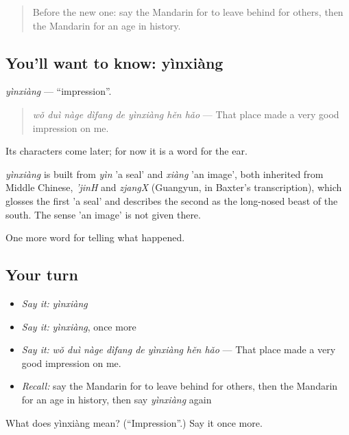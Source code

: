 \label{lesson:ZH-C324-yinxiang}



\begin{quote}
Before the new one: say the Mandarin for to leave behind for others, then the Mandarin for an age in history.
\end{quote}

\subsection*{You'll want to know: yìnxiàng}
\emph{yìnxiàng} — \textquotedblleft{}impression\textquotedblright{}.

\begin{quote}
\emph{wǒ duì nàge dìfang de yìnxiàng hěn hǎo} — That place made a very good impression on me.
\end{quote}

Its characters come later; for now it is a word for the ear.

\begin{cousinweb}
\emph{yìnxiàng} is built from \emph{yìn} 'a seal' and \emph{xiàng} 'an image', both inherited from Middle Chinese, \emph{'jinH} and \emph{zjangX} (Guangyun, in Baxter's transcription), which glosses the first 'a seal' and describes the second as the long-nosed beast of the south. The sense 'an image' is not given there.
\end{cousinweb}

\begin{grammarlens}[title={What you've built}]
One more word for telling what happened.
\end{grammarlens}

\subsection*{Your turn}
\begin{itemize}
\raggedright
  \item \emph{Say it:} \emph{yìnxiàng}
  \item \emph{Say it:} \emph{yìnxiàng}, once more
  \item \emph{Say it:} \emph{wǒ duì nàge dìfang de yìnxiàng hěn hǎo} — That place made a very good impression on me.
  \item \emph{Recall:} say the Mandarin for to leave behind for others, then the Mandarin for an age in history, then say \emph{yìnxiàng} again
\end{itemize}

\begin{tcolorbox}[breakable,colback=teal!4,colframe=teal!35!black,title={Before you move on}]
What does yìnxiàng mean? (\textquotedblleft{}Impression\textquotedblright{}.) Say it once more.
\end{tcolorbox}
